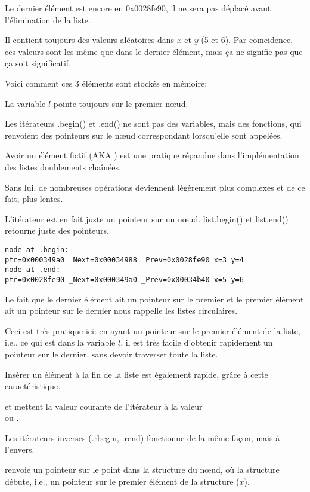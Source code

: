 Le dernier élément est encore en 0x0028fe90, il ne sera pas déplacé avant l'élimination
de la liste.

Il contient toujours des valeurs aléatoires dans $x$ et $y$ (5 et 6).
Par coïncidence, ces valeurs sont les même que dans le dernier élément, mais ça ne
signifie pas que ça soit significatif.

Voici comment ces 3 éléments sont stockés en mémoire:



La variable $l$ pointe toujours sur le premier n\oe{}ud.

Les itérateurs .begin() et .end() ne sont pas des variables, mais des fonctions,
qui renvoient des pointeurs sur le n\oe{}ud correspondant lorsqu'elle sont appelées.

Avoir un élément fictif (\ac{AKA} ) est une pratique répandue
dans l'implémentation des listes doublements chaînées.

Sans lui, de nombreuses opérations deviennent légèrement plus complexes et de ce fait,
plus lentes.

L'itérateur est en fait juste un pointeur sur un n\oe{}ud.
list.begin() et list.end() retourne juste des pointeurs.

\begin{lstlisting}
node at .begin:
ptr=0x000349a0 _Next=0x00034988 _Prev=0x0028fe90 x=3 y=4
node at .end:
ptr=0x0028fe90 _Next=0x000349a0 _Prev=0x00034b40 x=5 y=6
\end{lstlisting}

Le fait que le dernier élément ait un pointeur sur le premier et le premier élément
ait un pointeur sur le dernier nous rappelle les listes circulaires.

Ceci est très pratique ici: en ayant un pointeur sur le premier élément de la liste,
i.e., ce qui est dans la variable $l$, il est très facile d'obtenir rapidement
un pointeur sur le dernier, sans devoir traverser toute la liste.

Insérer un élément à la fin de la liste est également rapide, grâce à cette caractéristique.

 et  mettent la valeur courante de l'itérateur à la valeur\\
 ou .

Les itérateurs inverses (.rbegin, .rend) fonctionne de la même façon, mais à l'envers.

 renvoie un pointeur sur le point dans la structure du n\oe{}ud, où la
structure débute, i.e., un pointeur sur le premier élément de la structure ($x$).


